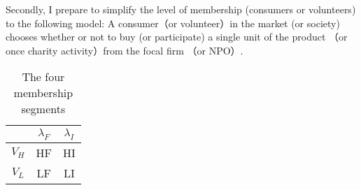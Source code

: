 \documentclass[12pt]{article}
\begin{document}
\begin{spacing}{1.5}
Secondly, I prepare to simplify the level of membership (consumers or volunteers) to the following model: A consumer（or volunteer）in the market (or society) chooses whether or not to buy (or participate) a single unit of the product （or once charity activity）from the focal firm （or NPO）.

  \begin{table}[ht]
  \centering
    \begin{tabular}{c  c  c }
      \toprule
       $ $ & $\lambda_F$ & $\lambda_I$\\
      \hline
      $V_H$ & HF & HI\\
      \hline
      $V_L$ & LF & LI\\
      \bottomrule
    \end{tabular}
    \caption{The four membership segments}
\end{table}












\end{spacing}
\end{document}
